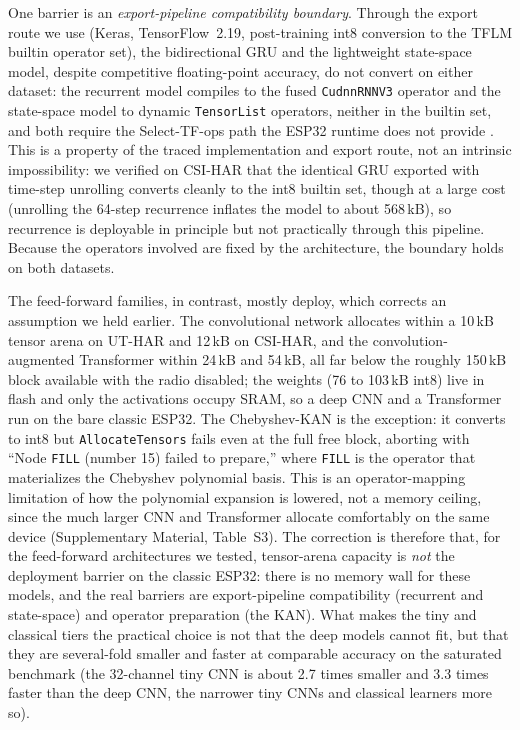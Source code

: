 \documentclass{ieeeaccess}
\begin{document}
One barrier is an \emph{export-pipeline compatibility boundary}. Through the export route we use (Keras, TensorFlow~2.19, post-training int8 conversion to the TFLM builtin operator set), the bidirectional GRU and the lightweight state-space model, despite competitive floating-point accuracy, do not convert on either dataset: the recurrent model compiles to the fused \texttt{CudnnRNNV3} operator and the state-space model to dynamic \texttt{TensorList} operators, neither in the builtin set, and both require the Select-TF-ops path the ESP32 runtime does not provide \cite{tfissue36688,tflmissue907}. This is a property of the traced implementation and export route, not an intrinsic impossibility: we verified on CSI-HAR that the identical GRU exported with time-step unrolling converts cleanly to the int8 builtin set, though at a large cost (unrolling the 64-step recurrence inflates the model to about 568\,kB), so recurrence is deployable in principle but not practically through this pipeline. Because the operators involved are fixed by the architecture, the boundary holds on both datasets.

The feed-forward families, in contrast, mostly deploy, which corrects an assumption we held earlier. The convolutional network allocates within a 10\,kB tensor arena on UT-HAR and 12\,kB on CSI-HAR, and the convolution-augmented Transformer within 24\,kB and 54\,kB, all far below the roughly 150\,kB block available with the radio disabled; the weights (76 to 103\,kB int8) live in flash and only the activations occupy SRAM, so a deep CNN and a Transformer run on the bare classic ESP32. The Chebyshev-KAN is the exception: it converts to int8 but \texttt{AllocateTensors} fails even at the full free block, aborting with ``Node \texttt{FILL} (number 15) failed to prepare,'' where \texttt{FILL} is the operator that materializes the Chebyshev polynomial basis. This is an operator-mapping limitation of how the polynomial expansion is lowered, not a memory ceiling, since the much larger CNN and Transformer allocate comfortably on the same device (Supplementary Material, Table~S3). The correction is therefore that, for the feed-forward architectures we tested, tensor-arena capacity is \emph{not} the deployment barrier on the classic ESP32: there is no memory wall for these models, and the real barriers are export-pipeline compatibility (recurrent and state-space) and operator preparation (the KAN). What makes the tiny and classical tiers the practical choice is not that the deep models cannot fit, but that they are several-fold smaller and faster at comparable accuracy on the saturated benchmark (the 32-channel tiny CNN is about 2.7 times smaller and 3.3 times faster than the deep CNN, the narrower tiny CNNs and classical learners more so).
\end{document}

